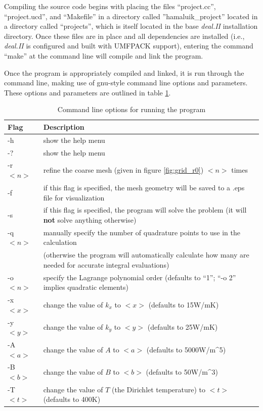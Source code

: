 \documentclass[letterpaper,10pt]{article}
\begin{document}
Compiling the source code begins with placing the files ``project.cc'', ``project.ucd'', and ``Makefile'' in a directory called ''hamaluik\_project'' located in a directory called ``projects'', which is itself located in the base \emph{deal.II} installation directory. Once these files are in place and all dependencies are installed (i.e., \emph{deal.II} is configured and built with UMFPACK support), entering the command ``make'' at the command line will compile and link the program.

Once the program is appropriately compiled and linked, it is run through the command line, making use of gnu-style command line options and parameters. These options and parameters are outlined in table \ref{tab:commandlineoptions}.

\begin{table}[H]
\centering
\caption{Command line options for running the program}
\label{tab:commandlineoptions}
\begin{tabular}{ll}
\hline \hline
Flag & Description \\
\hline
	-h & show the help menu \\
	-? & show the help menu \\
	-r $<n>$ & refine the coarse mesh (given in figure \ref{fig:grid_r0}) $<n>$ times \\
	-f & if this flag is specified, the mesh geometry will be saved to a .eps file for visualization \\
	-s & if this flag is specified, the program will solve the problem (it will \textbf{not} solve anything otherwise) \\
	-q $<n>$ & manually specify the number of quadrature points to use in the calculation \\
			 & (otherwise the program will automatically calculate how many are needed for accurate integral evaluations) \\
	-o $<n>$ & specify the Lagrange polynomial order (defaults to ``1''; ``-o 2'' implies quadratic elements) \\
	-x $<x>$ & change the value of $k_x$ to $<x>$ (defaults to \unit{15}{W/m\usk K}) \\
	-y $<y>$ & change the value of $k_y$ to $<y>$ (defaults to \unit{25}{W/m\usk K}) \\
	-A $<a>$ & change the value of $A$ to $<a>$ (defaults to \unit{5000}{W/m^5}) \\
	-B $<b>$ & change the value of $B$ to $<b>$ (defaults to \unit{50}{W/m^3}) \\
	-T $<t>$ & change the value of $T$ (the Dirichlet temperature) to $<t>$ (defaults to \unit{400}{K}) \\
\hline
\end{tabular}
\end{table}
\end{document}
